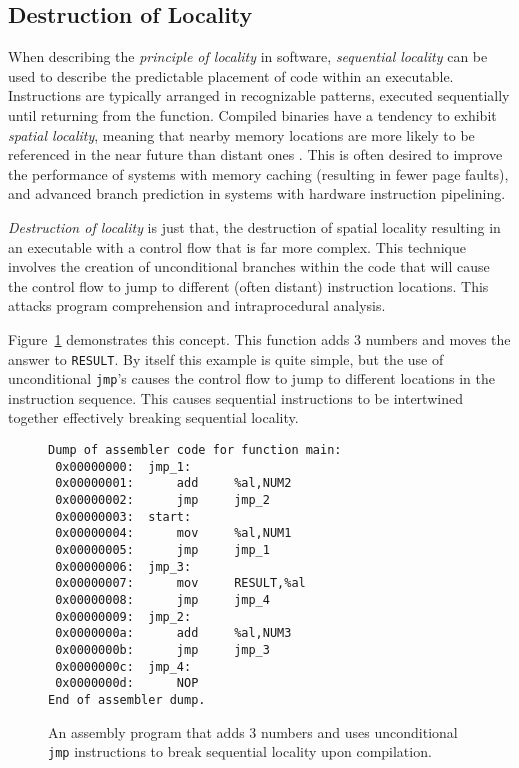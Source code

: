 \documentclass[conference]{IEEEtran}
\begin{document}
\subsection{Destruction of Locality}
When describing the \textit{principle of locality} in software, \textit{sequential locality} can be used to describe the predictable placement of code within an executable. Instructions are typically arranged in recognizable patterns, executed sequentially until returning from the function. Compiled binaries have a tendency to exhibit \textit{spatial locality}, meaning that nearby memory locations are more likely to be referenced in the near future than distant ones \cite{b7}. This is often desired to improve the performance of systems with memory caching (resulting in fewer page faults), and advanced branch prediction in systems with hardware instruction pipelining.

\textit{Destruction of locality} is just that, the destruction of spatial locality resulting in an executable with a control flow that is far more complex. This technique involves the creation of unconditional branches within the code that will cause the control flow to jump to different (often distant) instruction locations. This attacks program comprehension and intraprocedural analysis.

Figure~\ref{fig-dest-local} demonstrates this concept. This function adds 3 numbers and moves the answer to \texttt{RESULT}. By itself this example is quite simple, but the use of unconditional \texttt{jmp}'s causes the control flow to jump to different locations in the instruction sequence. This causes sequential instructions to be intertwined together effectively breaking sequential locality.
    
\begin{figure}[h]
\begin{lstlisting}[basicstyle=\footnotesize]
Dump of assembler code for function main:
 0x00000000:  jmp_1:
 0x00000001:      add     %al,NUM2
 0x00000002:      jmp     jmp_2
 0x00000003:  start:
 0x00000004:      mov     %al,NUM1
 0x00000005:      jmp     jmp_1
 0x00000006:  jmp_3:
 0x00000007:      mov     RESULT,%al
 0x00000008:      jmp     jmp_4
 0x00000009:  jmp_2:
 0x0000000a:      add     %al,NUM3
 0x0000000b:      jmp     jmp_3
 0x0000000c:  jmp_4:
 0x0000000d:      NOP
End of assembler dump.
\end{lstlisting} 
\caption{An assembly program that adds 3 numbers and uses unconditional \texttt{jmp} instructions to break sequential locality upon compilation.}
\label{fig-dest-local}
\end{figure}
\end{document}
